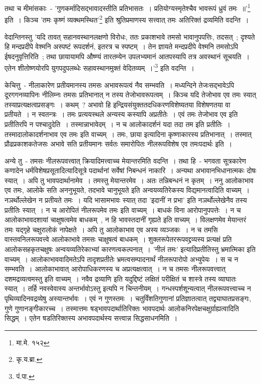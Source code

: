		तथा च मीमांसकाः~- {\fontsize{11.7}{0}\selectfont\s 'गुणकर्मादिसद्भावादस्तीति प्रतिभासतः~। प्रतियोग्यस्मृतेश्चैव भावरूपं ध्रुवं तमः~॥'\footnote{मा.मे. १५२}} इति~। किञ्च {\fontsize{11.7}{0}\selectfont\s 'तमः कृष्णं व्यक्थमस्थित'\footnote{कृ.य.ब्रा. }} इति श्रुतिप्रमाणस्य सत्त्वात् तमः अतिरिक्तं द्रव्यमिति वदन्ति~।

		वेदान्तिनस्तु {\fontsize{11.7}{0}\selectfont\s 'यदि तावत् सहानवस्थानलक्षणो विरोधः, ततः प्रकाशभावे तमसो भावानुपपत्तिः, तदसत्~; दृश्यते हि मन्दप्रदीपे वेश्मनि अस्पष्टं रूपदर्शनं, इतरत्र च स्पष्टम्~। तेन ज्ञायते मन्दप्रदीपे वेश्मनि तमसोऽपि ईषदनुवृत्तिरिति~; तथा छायायामपि औष्ण्यं तारतम्येन उपलभ्यमानं आतपस्यापि तत्र अवस्थानं सूचयति~। एतेन शीतोष्णयोरपि युगपदुपलब्धेः सहावस्थानमुक्तं वेदितव्यम्~।'\footnote{पं.पा.}} इति वदन्ति~।
		  
		केचित्तु~- नीलाकारेण प्रतीयमानस्य तमसः अभावरूपत्वं नैव सम्भवति~। मध्यन्दिने तेजःसद्भावेऽपि दूरगगनव्यापिनः नीलिम्नः तमसः प्रतिभानात् न तस्य तेजोभावरूपत्वम्~। किञ्च यदि तेजोभाव एव तमः स्यात् तस्याप्रत्यक्षत्वप्रसङ्गः~। कथम्~? अभावो हि इन्द्रियसंयुक्ततदधिकरणविशेष्यतया विशेषणतया वा प्रतीयते~। न स्वतन्त्रः~। तमः प्रत्ययस्थले अन्यस्य कस्यापि अप्रतीतेः~। एवं तमः तेजोभाव एव इति प्रतीतिरपि न पश्चादुदेति~। तस्मान्नाभावेदम्~। न च आलोकादर्शनं यदा तदा तम इति प्रतीतिः~। तस्मादालोकादर्शनाभाव एव तमः इति वाच्यम्~। तमः, छाया इत्यादिना कृष्णाकारस्य प्रतिभानात्~। तस्मात् प्रौढप्रकाशकतेजसः अभावे सति प्रतीयमानः  सर्वतः समारोपितः  नीलरूपविशेष एव तमःपदार्थः इति~।

		अन्ये तु~- तमसः नीलरूपवत्त्वात् क्रियादिमत्त्वाच्च मेयान्तरमिति वदन्ति~। तथा हि~- भगवता सूत्रकारेण कणादेन धर्मविशेषप्रसूतादित्यादिसूत्रे पदार्थानां सर्वेषां निबन्धनं नाकारि~। अन्यथा अभावानभिधानात्मकः दोषः स्यात्~। अपि तु भावपदार्थानामेव~। तमस्तु मेयान्तरमेव~। अतः तन्निबन्धनं न कृतम्~। ननु आलोकाभाव एव तमः, आलोके सति अननुभूयते, तदभावे चानुभूयते इति अन्वयव्यतिरेकस्य विद्यमानत्वादिति वाच्यम्~। नञर्थोल्लेखेन न प्रतीयते तमः~। यदि भासामभावः‌ स्यात् तदा 'इदानीं न प्रभा' इति नञर्थोल्लेखेनैव तस्य प्रतीतिः स्यात्~। न च आरोपितं नीलरूपमेव तमः इति वाच्यम्~। बाधकं विना आरोपानुपपत्तेः~। न च आलोकाभावदशायां चाक्षुषत्वमेव बाधकम्~, न हि भावस्तदानीं गृह्यते  इति वाच्यम्~। विलक्षणमेव मेयान्तरं तमः यद्गृहे चक्षुरालोकं नापेक्षते~। अपि तु आलोकाभाव एव अस्य व्यञ्जकः~। न च तमसि वास्तवनिलरूपवत्त्वे आलोकाभावे तमसः चाक्षुषत्वं बाधकम्~। शुक्लरूपेतररूपवद्द्रव्यस्य प्रत्यक्षं प्रति आलोकसहकृतचक्षुषः अन्वयव्यतिरेकाभ्यां कारणत्वकल्पनात्~। 'नीलं तमः' इत्यादिप्रतीतिस्तु भ्रमात्मिका इति वाच्यम्~। आलोकाभाववादिमतेऽपि तादृशप्रतीतेः भ्रमत्वसम्पादनार्थं नीलरूपारोपो अभ्युपेयः~। स च न सम्भवति~। आलोकाभावात् आरोपाधिकरणस्य च अप्रत्यक्षत्वात्~। न च तमसः नीलरूपवत्त्वात् दशमद्रव्यत्वमस्तु इति वाच्यम्~। नवैव द्रव्याणि इति यदुद्दिष्टं लक्षितं परीक्षितं च शास्त्रे तस्य व्याघातः स्यात्~। तर्हि नवस्वेवास्य अन्तर्भावोऽस्तु इत्यपि न चिन्तनीयम्~। गन्धस्पर्शशून्यत्वात् नीलरूपवत्त्वाच्च न पृथिव्यादिनवद्रव्येषु अस्यान्तर्भावः~। एवं न गुणस्तमः~। चतुर्विंशतिगुणानां प्रतिज्ञातत्वात् तद्व्याघातप्रसङ्गः, गुणे गुणानङ्गीकारच्च~। तस्मात्तमः षड्भावपदार्थातिरिक्तः भावपदार्थः आलोकनिरपेक्षचक्षुर्ग्राह्यत्वादिति सिद्धम्~। एतेन षडतिरिक्तस्य अभावपदार्थस्य सत्त्वान्न सिद्धसाधनमिति~।

